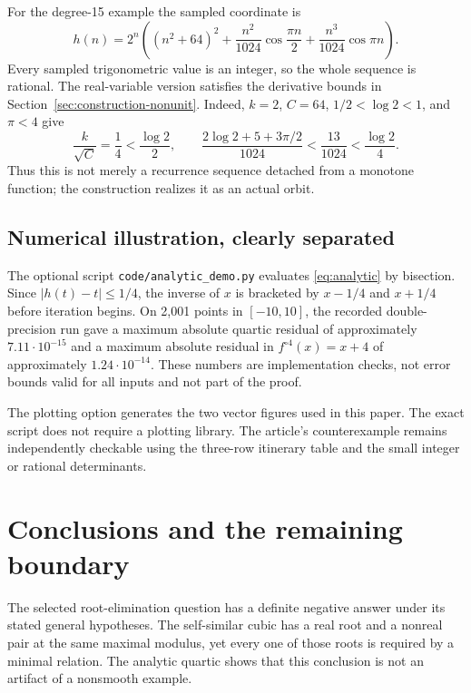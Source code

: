 \documentclass[11pt,letterpaper]{article}
\theoremstyle{definition}
\theoremstyle{remark}
\newcommand{\itn}[2]{#1^{\circ #2}}
\begin{document}
For the degree-15 example the sampled coordinate is
\begin{equation}
 h(n)=2^n\left((n^2+64)^2
       +\frac{n^2}{1024}\cos\frac{\pi n}{2}
       +\frac{n^3}{1024}\cos\pi n\right).
 \label{eq:sample15}
\end{equation}
Every sampled trigonometric value is an integer, so the whole sequence is
rational. The real-variable version satisfies the derivative bounds in
Section~\ref{sec:construction-nonunit}. Indeed, $k=2$, $C=64$,
$1/2<\log2<1$, and $\pi<4$ give
\begin{equation}
 \frac{k}{\sqrt C}=\frac14<\frac{\log2}{2},\qquad
 \frac{2\log2+5+3\pi/2}{1024}
   <\frac{13}{1024}<\frac{\log2}{4}.
\end{equation}
Thus this is not merely a recurrence sequence detached from a monotone
function; the construction realizes it as an actual orbit.

\subsection{Numerical illustration, clearly separated}

The optional script \texttt{code/analytic\_demo.py} evaluates
\eqref{eq:analytic} by bisection. Since $|h(t)-t|\le1/4$, the inverse of
$x$ is bracketed by $x-1/4$ and $x+1/4$ before iteration begins.
On 2,001 points in $[-10,10]$, the recorded double-precision run gave a
maximum absolute quartic residual of approximately $7.11\cdot10^{-15}$
and a maximum absolute residual in $\itn{f}{4}(x)=x+4$ of approximately
$1.24\cdot10^{-14}$. These numbers are implementation checks, not error
bounds valid for all inputs and not part of the proof.

The plotting option generates the two vector figures used in this paper.
The exact script does not require a plotting library. The article's
counterexample remains independently checkable using the three-row
itinerary table and the small integer or rational determinants.

\section{Conclusions and the remaining boundary}
\label{sec:conclusion}

The selected root-elimination question has a definite negative answer
under its stated general hypotheses. The self-similar cubic has a real
root and a nonreal pair at the same maximal modulus, yet every one of
those roots is required by a minimal relation. The analytic quartic
shows that this conclusion is not an artifact of a nonsmooth example.
\end{document}
